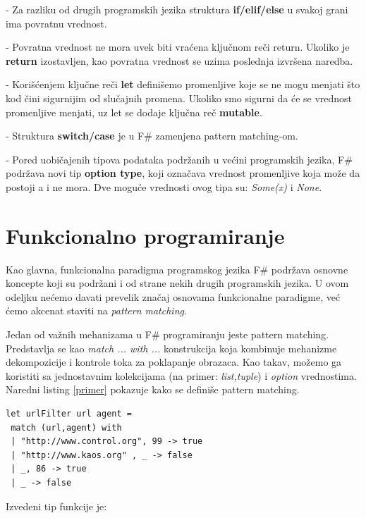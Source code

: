 \documentclass[a4paper]{article}
\begin{document}
	- Za razliku od drugih programskih jezika struktura \textbf{if/elif/else} u svakoj grani ima povratnu vrednost.
	 
	- Povratna vrednost ne mora uvek biti vraćena ključnom reči return. Ukoliko je \textbf{return} izostavljen, kao povratna vrednost se uzima poslednja izvršena naredba.
	 
	- Korišćenjem ključne reči \textbf{let} definišemo promenljive koje se ne mogu menjati što kod čini sigurnijim od slučajnih promena. Ukoliko smo sigurni da će se vrednost promenljive menjati, uz let se dodaje ključna reč \textbf{mutable}.
	 
	- Struktura \textbf{switch/case} je u F\# zamenjena pattern matching-om\cite{expertFS}.
	 
	- Pored uobičajenih tipova podataka podržanih u većini programskih jezika, F\# podržava novi tip \textbf{option type}, koji označava vrednost promenljive koja može da postoji a i ne mora. Dve moguće vrednosti ovog tipa su: {\em Some(x)} i {\em None}.

\section{Funkcionalno programiranje}



Kao glavna, funkcionalna paradigma programskog jezika F\# podržava osnovne koncepte koji su podržani i od strane nekih drugih programskih jezika. U ovom odeljku nećemo davati prevelik značaj osnovama funkcionalne paradigme, već ćemo akcenat staviti na {\em pattern matching}\cite{expertFS}.

Jedan od važnih mehanizama u F\# programiranju jeste pattern matching. Predstavlja se kao {\em match ... with ...} konstrukcija koja kombinuje mehanizme dekompozicije i kontrole toka za poklapanje obrazaca. Kao takav, možemo ga koristiti sa  jednostavnim kolekcijama (na primer: {\em list,tuple}) i {\em option} vrednostima. Naredni listing \ref{primer} pokazuje kako se definiše pattern matching.
\\
\begin{lstlisting}[caption={Primer pattern matching-a\cite{expertFS}},frame=single, label=primer]
let urlFilter url agent =
 match (url,agent) with
 | "http://www.control.org", 99 -> true
 | "http://www.kaos.org" , _ -> false
 | _, 86 -> true
 | _ -> false
\end{lstlisting} 

Izvedeni tip funkcije je:
\end{document}
